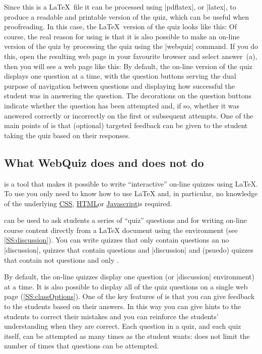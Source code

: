 \documentclass[svgnames]{article}
\newcommand{\HTML}{\href{https://www.w3schools.com/html/html_intro.asp}{HTML}}
\newcommand\CSS{\href{https://www.w3schools.com/css}{CSS}}
\newcommand\Javascript{\href{https://www.w3schools.com/Js/}{Javascript}}
\begin{document}
    Since this is a \LaTeX\ file it can be processed using
    \BashCode|pdflatex|, or \BashCode|latex|, to produce a readable and
    printable version of the quiz, which can be useful when
    proofreading. In this case, the \LaTeX\ version of the quiz looks
    like this:
    Of course, the real reason for using \WebQuiz is that it is also
    possible to make an on-line version of the quiz by processing the
    quiz using the \BashCode|webquiz| command. If you do this, open
    the resulting web page in your favourite browser and select answer~(a),
    then you will see a web page like this:
    By default, the on-line version of the quiz displays one question at
    a time, with the question buttons serving the dual purpose of
    navigation between questions and displaying how successful the
    student was in answering the question. The decorations on the
    question buttons indicate whether the question has been attempted
    and, if so, whether it was answered correctly or incorrectly on the
    first or subsequent attempts. One of the main points of \WebQuiz is
    that (optional) targeted feedback can be given to the student taking
    the quiz based on their responses.

\subsection{What WebQuiz does and does not do}

    \WebQuiz is a tool that makes it possible to write ``interactive''
    on-line quizzes using \LaTeX{}. To use \WebQuiz you only need to
    know how to use \LaTeX{} and, in particular, no knowledge of the
    underlying \CSS, \HTML or \Javascript is required.

    \WebQuiz can be used to ask students a series of ``quiz'' questions
    and for writing on-line course content directly from a \LaTeX{}
    document using the \WebQuiz {} environment (see
    \autoref{SS:discussion}). You can write \WebQuiz quizzes that only
    contain questions an no \LatexCode|discussion|, quizzes that contain
    questions and \LatexCode|discussion| and (psuedo) quizzes that
    contain not questions and only .

    By default, the on-line quizzes display one question (or
    \LatexCode|discussion| environment) at a time.  It is also possible
    to display all of the quiz questions on a single web page
    (\autoref{SS:classOptions}). One of the key features of \WebQuiz is
    that you can give feedback to the students based on their answers.
    In this way you can give hints to the students to correct their
    mistakes and you can reinforce the students' understanding when they
    are correct. Each question in a quiz, and each quiz itself, can be
    attempted as many times as the student wants: \WebQuiz does not
    limit the number of times that questions can be attempted.
\end{document}
